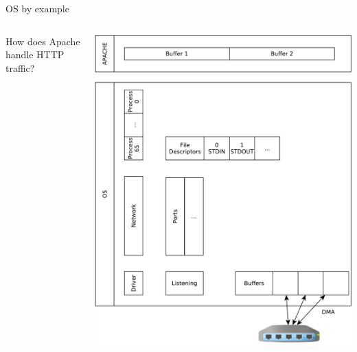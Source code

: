 \documentclass{beamer}
\begin{document}
\begin{frame}[t]{OS by example}
\begin{columns}
\begin{column}[t]{0.5\textwidth}
  How does Apache handle HTTP traffic?
\end{column}
\begin{column}[t]{0.5\textwidth}  %
    \begin{center}
  \includegraphics[width=0.9\linewidth]{sock_mem_0}
\end{center}
\end{column}
\end{columns}
\end{frame}
\end{document}
